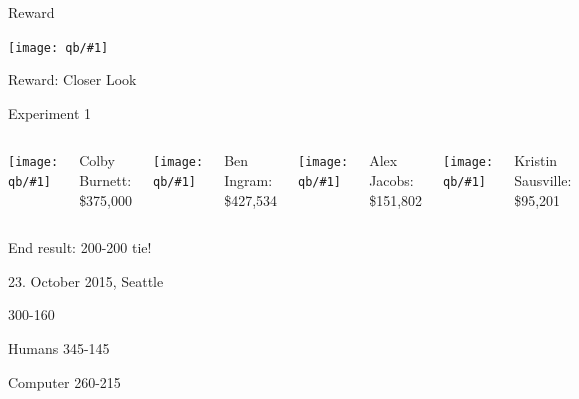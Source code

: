 \documentclass[xcolor=dvipsnames]{beamer}
\newcommand{\fsi}[2]{
\begin{frame}[plain]
\vspace*{-1pt}
\makebox[\linewidth]{\texttt{[image: \#1]}}
\begin{center}
#2
\end{center}
\end{frame}
}
\newcommand{\gfxq}[2]{
\begin{center}
	\texttt{[image: qb/\#1]}
\end{center}
}
\begin{document}
\begin{frame}{Reward}

  \gfxq{dqn_results}{.5}

\end{frame}

\begin{frame}{Reward: Closer Look}

  \only<1>{\gfxq{reward1}{.8}}
  \only<2>{\gfxq{reward2}{.8}}
  \only<3>{\gfxq{reward3}{.8}}
  \only<4>{\gfxq{reward4}{.8}}
\end{frame}

\begin{frame}{Experiment 1}

		\begin{columns}
				\gfxq{colby_jeo}{1.0}
                                Colby Burnett:
                                \$375,000
				\gfxq{ben_jeo}{1.0}
                                Ben Ingram:
                                \$427,534
				\gfxq{alex_jeo}{1.0}
                                Alex Jacobs: \$151,802
				\gfxq{kristin_jeo}{1.0}
                                Kristin Sausville: \$95,201
		\end{columns}

                \pause


                \begin{center}
                End result: 200-200 tie!
                \end{center}

\end{frame}

\fsi{qb/hsnct1}{}
\fsi{qb/jennings}{23. October 2015, Seattle}
\fsi{qb/jennings_handshake}{300-160}
\fsi{qb/nasat}{Humans 345-145}
\fsi{qb/hsnct_2017}{Computer 260-215}
\end{document}
